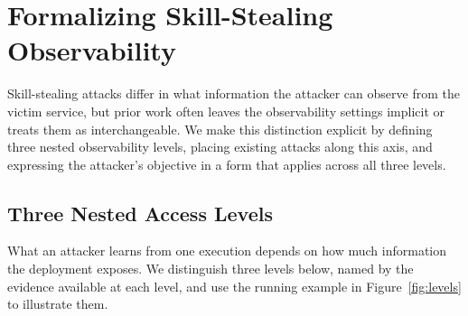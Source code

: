 \documentclass[letterpaper,twocolumn,10pt]{article}
\begin{document}
\section{Formalizing Skill-Stealing Observability}
\label{sec:formalization}

Skill-stealing attacks differ in what information the attacker can observe from the victim service, but prior work often leaves the observability settings implicit or treats them as interchangeable. We make this distinction explicit by defining three nested observability levels, placing existing attacks along this axis, and expressing the attacker’s objective in a form that applies across all three levels.


\subsection{Three Nested Access Levels}
\label{sec:access-levels}

What an attacker learns from one execution depends on how much information the deployment exposes. 
We distinguish three levels below, named by the evidence available at each level, and use the running example in Figure~\ref{fig:levels} to illustrate them.

\end{document}
